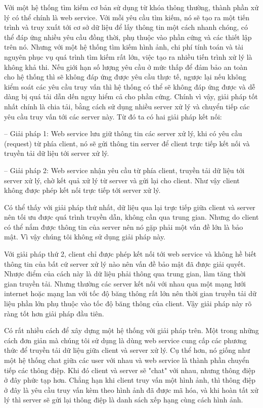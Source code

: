 Với một hệ thống tìm kiếm cơ bản sử dụng từ khóa thông thường, thành phần xử lý có thể chính là web service. Với mỗi yêu cầu tìm kiếm, nó sẽ tạo ra một tiến trình và truy xuất tới cơ sở dữ liệu để lấy thông tin một cách nhanh chóng, có thể đáp ứng nhiều yêu cầu đồng thời, phụ thuộc vào phần cứng và các thiết lập trên nó. Nhưng với một hệ thống tìm kiếm hình ảnh, chi phí tính toán và tài nguyên phục vụ quá trình tìm kiếm rất lớn, việc tạo ra nhiều tiến trình xử lý là không khả thi. Nếu giới hạn số lượng yêu cầu ở mức thấp để đảm bảo an toàn cho hệ thống thì sẽ không đáp ứng được yêu cầu thực tế, ngược lại nếu không kiểm soát các yêu cầu truy vấn thì hệ thống có thể sẽ không đáp ứng được và dễ dàng bị quá tải dẫn dến nguy hiểm cả cho phần cứng. Chính vì vậy, giải pháp tốt nhất chính là chia tải, bằng cách sử dụng nhiều server xử lý và chuyển tiếp các yêu cầu truy vấn tới các server này. Từ đó ta có hai giải pháp kết nối:

-- Giải pháp 1: Web service lưu giữ thông tin các server xử lý, khi có yêu cầu (request) từ phía client, nó sẽ gửi thông tin server để client trực tiếp kết nối và truyền tải dữ liệu tới server xử lý.

-- Giải pháp 2: Web service nhận yêu cầu từ phía client, truyền tải dữ liệu tới server xử lý, chờ kết quả xử lý từ server và gửi lại cho client. Như vậy client không được phép kết nối trực tiếp tới server xử lý.

Có thể thấy với giải pháp thứ nhất, dữ liệu qua lại trực tiếp giữa client và server nên tối ưu được quá trình truyền dẫn, không cần qua trung gian. Nhưng do client có thể nắm được thông tin của server nên nó gặp phải một vấn đề lớn là bảo mật. Vì vậy chúng tôi không sử dụng giải pháp này.

Với giải pháp thứ 2, client chỉ được phép kết nối tới web service và không hề biết thông tin của bất cứ server xử lý nào nên vấn đề bảo mật đã được giải quyết. Nhược điểm của cách này là dữ liệu phải thông qua trung gian, làm tăng thời gian truyền tải. Nhưng thường các server kết nối với nhau qua một mạng lưới internet hoặc mạng lan với tốc độ băng thông rất lớn nên thời gian truyền tải dữ liệu phần lớn phụ thuộc vào tốc độ băng thông của client. Vậy giải pháp này rõ ràng tốt hơn giải pháp đầu tiên.

Có rất nhiều cách để xây dựng một hệ thống với giải pháp trên. Một trong những cách đơn giản mà chúng tôi sử dụng là dùng web service cung cấp các phương thức để truyền tải dữ liệu giữa client và server xử lý. Cụ thể hơn, nó giống như một hệ thống chat giữa các user với nhau và web service là thành phần chuyển tiếp các thông điệp. Khi đó client và server sẽ "chat" với nhau, nhưng thông điệp ở đây phức tạp hơn. Chẳng hạn khi client truy vấn một hình ảnh, thì thông điệp ở đây là yêu cầu truy vấn kèm theo hình ảnh đã được mã hóa, và khi hoàn tất xử lý thì server sẽ gửi lại thông điệp là danh sách xếp hạng cùng cách hình ảnh.

